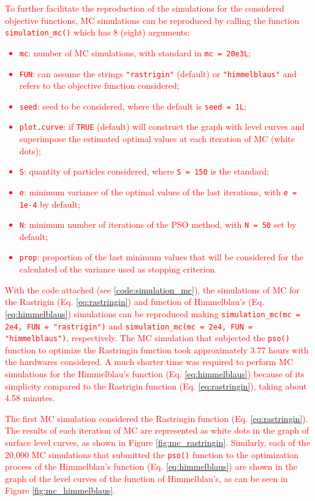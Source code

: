 \documentclass[10pt,letterpaper]{article}
\begin{document}
\textcolor{red}{To further facilitate the reproduction of the simulations for the considered objective functions, MC simulations can be reproduced by calling the function \texttt{simulation\_mc()} which has 8 (eight) arguments:
\begin{itemize}
	\item \texttt{mc}: number of MC simulations, with standard in \texttt{mc = 20e3L};
	\item \texttt{FUN}: can assume the strings \texttt{"rastrigin"} (default) or \texttt{"himmelblaus"} and refers to the objective function considered;
	\item \texttt{seed}: seed to be considered, where the default is \texttt{seed = 1L};
	\item \texttt{plot.curve}: if \texttt{TRUE} (default) will construct the graph with level curves and superimpose the estimated optimal values at each iteration of MC (white dots);
	\item \texttt{S}: quantity of particles considered, where \texttt{S = 150} is the standard;
	\item \texttt{e}: minimum variance of the optimal values of the last iterations, with \texttt{e = 1e-4} by default;
	\item \texttt{N}: minimum number of iterations of the PSO method, with \texttt{N = 50} set by default;
	\item \texttt{prop}: proportion of the last minimum values that will be considered for the calculated of the variance used as stopping criterion.
\end{itemize} 
}

\textcolor{red}{With the code attached (see \ref{code:simulation_mc}), the simulations of MC for the Rastrigin (Eq. \ref{eq:rastringin}) and function of Himmelblau's (Eq. \ref{eq:himmelblaus}) simulations can be reproduced making \texttt{simulation\_mc(mc = 2e4, FUN = "rastrigin")} and \texttt{simulation\_mc(mc = 2e4, FUN = "himmelblaus")}, respectively. The MC simulation that subjected the \texttt{pso()} function to optimize the Rastringin function took approximately 3.77 hours with the hardwares considered. A much shorter time was required to perform MC simulations for the Himmelblau's function (Eq. \ref{eq:himmelblaus}) because of its simplicity compared to the Rastrigin function (Eq. \ref{eq:rastringin}), taking about 4.58 minutes.}

\textcolor{red}{The first MC simulation considered the Rastringin function (Eq. \ref{eq:rastringin}). The results of each iteration of MC are represented as white dots in the graph of surface level curves, as shown in Figure \ref{fig:mc_rastringin}. Similarly, each of the 20,000 MC simulations that submitted the \texttt{pso()} function to the optimization process of the Himmelblau's function (Eq. \ref{eq:himmelblaus}) are shown in the graph of the level curves of the function of Himmelblau's, as can be seen in Figure \ref{fig:mc_himmelblaus}.}
\end{document}
